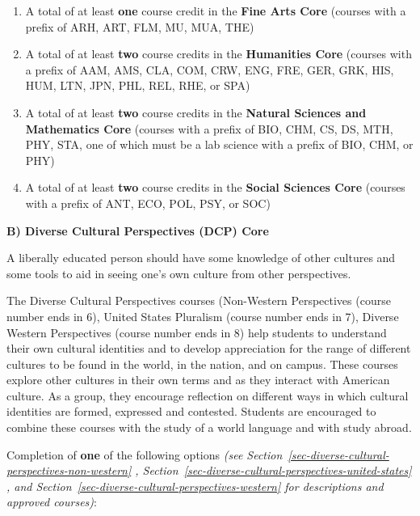 \documentclass[
  letterpaper,
]{scrbook}
\providecommand{\tightlist}{%
  \setlength{\itemsep}{0pt}\setlength{\parskip}{0pt}}
\begin{document}
\begin{enumerate}
\def\labelenumi{\arabic{enumi}.}
\tightlist
\item
  A total of at least \textbf{one} course credit in the \textbf{Fine
  Arts Core} (courses with a prefix of ARH, ART, FLM, MU, MUA, THE)
\item
  A total of at least \textbf{two} course credits in the
  \textbf{Humanities Core} (courses with a prefix of AAM, AMS, CLA, COM,
  CRW, ENG, FRE, GER, GRK, HIS, HUM, LTN, JPN, PHL, REL, RHE, or SPA)
\item
  A total of at least \textbf{two} course credits in the \textbf{Natural
  Sciences and Mathematics Core} (courses with a prefix of BIO, CHM, CS,
  DS, MTH, PHY, STA, one of which must be a lab science with a prefix of
  BIO, CHM, or PHY)
\item
  A total of at least \textbf{two} course credits in the \textbf{Social
  Sciences Core} (courses with a prefix of ANT, ECO, POL, PSY, or SOC)
\end{enumerate}

\textbf{B) Diverse Cultural Perspectives (DCP) Core}

A liberally educated person should have some knowledge of other cultures
and some tools to aid in seeing one's own culture from other
perspectives.

The Diverse Cultural Perspectives courses (Non-Western Perspectives
(course number ends in 6), United States Pluralism (course number ends
in 7), Diverse Western Perspectives (course number ends in 8) help
students to understand their own cultural identities and to develop
appreciation for the range of different cultures to be found in the
world, in the nation, and on campus. These courses explore other
cultures in their own terms and as they interact with American culture.
As a group, they encourage reflection on different ways in which
cultural identities are formed, expressed and contested. Students are
encouraged to combine these courses with the study of a world language
and with study abroad.

Completion of \textbf{one} of the following options \emph{(see
Section~\ref{sec-diverse-cultural-perspectives-non-western} ,
Section~\ref{sec-diverse-cultural-perspectives-united-states} , and
Section~\ref{sec-diverse-cultural-perspectives-western} for descriptions
and approved courses)}:
\end{document}
